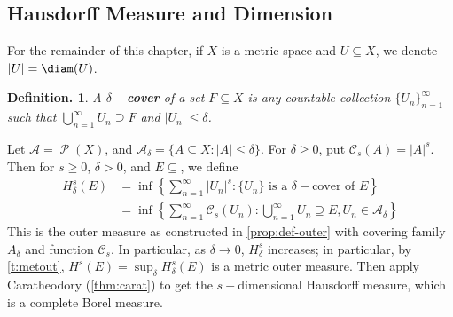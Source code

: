 \documentclass[11pt, a4paper]{memoir}
\theoremstyle{change}
\theoremstyle{plain}
\theoremstyle{nonumberplain}
\newtheorem{definition}{Definition.}
\DeclareMathOperator{\ps}{{\mathcal{P}}}
\newcommand{\defn}[1]{{\boldmath\bfseries #1}}
\numberwithin{equation}{section}
\begin{document}
\subsection{Hausdorff Measure and Dimension}
For the remainder of this chapter, if $X$ is a metric space and $U\subseteq X$, we denote $|U|=\diam(U)$.
\begin{definition}
    A \defn{$\delta-$cover} of a set $F\subseteq X$ is any countable collection $\{U_n\}_{n=1}^\infty$ such that $\bigcup_{n=1}^\infty U_n\supseteq F$ and $|U_n|\leq\delta$.
\end{definition}
Let $\mathcal{A}=\ps(X)$, and $\mathcal{A}_\delta=\{A\subseteq X:|A|\leq\delta\}$.
For $\delta\geq 0$, put $\mathcal{C}_s(A)=|A|^s$.
Then for $s\geq 0$, $\delta>0$, and $E\subseteq $, we define
\begin{align*}
    H_\delta^s(E)&=\inf\left\{\sum_{n=1}^\infty|U_n|^s:\{U_n\}\text{ is a $\delta-$cover of }E\right\}\\
                 &= \inf\left\{\sum_{n=1}^\infty\mathcal{C}_s(U_n):\bigcup_{n=1}^\infty U_n\supseteq E,U_n\in\mathcal{A}_\delta\right\}
\end{align*}
This is the outer measure as constructed in \cref{prop:def-outer} with covering family $A_\delta$ and function $\mathcal{C}_s$.
In particular, as $\delta\to 0$, $H_\delta^s$ increases; in particular, by \cref{t:metout}, $H^s(E)=\sup_\delta H_\delta^s(E)$ is a metric outer measure.
Then apply Caratheodory (\cref{thm:carat}) to get the $s-$dimensional Hausdorff measure, which is a complete Borel measure.
\end{document}
